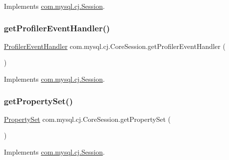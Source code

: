Implements \mbox{\hyperlink{interfacecom_1_1mysql_1_1cj_1_1_session_a25f2c23d8ac5ae3e87491a66aabddceb}{com.\+mysql.\+cj.\+Session}}.

\mbox{\label{classcom_1_1mysql_1_1cj_1_1_core_session_ada22cc07db1eb2fb753966f8b0e74183}} 
\subsubsection{\texorpdfstring{get\+Profiler\+Event\+Handler()}{getProfilerEventHandler()}}
{\footnotesize\ttfamily \mbox{\hyperlink{interfacecom_1_1mysql_1_1cj_1_1log_1_1_profiler_event_handler}{Profiler\+Event\+Handler}} com.\+mysql.\+cj.\+Core\+Session.\+get\+Profiler\+Event\+Handler (\begin{DoxyParamCaption}{ }\end{DoxyParamCaption})}



Implements \mbox{\hyperlink{interfacecom_1_1mysql_1_1cj_1_1_session_ae756dd958f6327818e84c16066b288df}{com.\+mysql.\+cj.\+Session}}.

\mbox{\label{classcom_1_1mysql_1_1cj_1_1_core_session_a1b6c6041a2c657d34bb369939f6b49d2}} 
\subsubsection{\texorpdfstring{get\+Property\+Set()}{getPropertySet()}}
{\footnotesize\ttfamily \mbox{\hyperlink{interfacecom_1_1mysql_1_1cj_1_1conf_1_1_property_set}{Property\+Set}} com.\+mysql.\+cj.\+Core\+Session.\+get\+Property\+Set (\begin{DoxyParamCaption}{ }\end{DoxyParamCaption})}



Implements \mbox{\hyperlink{interfacecom_1_1mysql_1_1cj_1_1_session_a76c18a20fdd1ad088a8053f236c57eb5}{com.\+mysql.\+cj.\+Session}}.

